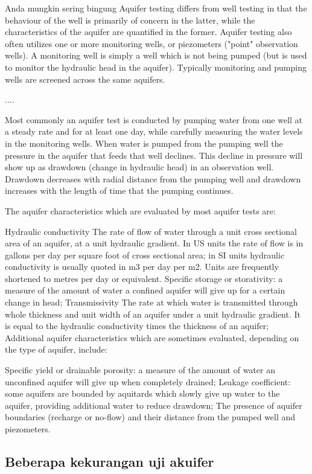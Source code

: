 Anda mungkin sering bingung Aquifer testing differs from well testing in that the behaviour of the well is primarily of concern in the latter, while the characteristics of the aquifer are quantified in the former. Aquifer testing also often utilizes one or more monitoring wells, or piezometers ("point" observation wells). A monitoring well is simply a well which is not being pumped (but is used to monitor the hydraulic head in the aquifer). Typically monitoring and pumping wells are screened across the same aquifers.

....

Most commonly an aquifer test is conducted by pumping water from one well at a steady rate and for at least one day, while carefully measuring the water levels in the monitoring wells. When water is pumped from the pumping well the pressure in the aquifer that feeds that well declines. This decline in pressure will show up as drawdown (change in hydraulic head) in an observation well. Drawdown decreases with radial distance from the pumping well and drawdown increases with the length of time that the pumping continues.

The aquifer characteristics which are evaluated by most aquifer tests are:

Hydraulic conductivity The rate of flow of water through a unit cross sectional area of an aquifer, at a unit hydraulic gradient. In US units the rate of flow is in gallons per day per square foot of cross sectional area; in SI units hydraulic conductivity is usually quoted in m3 per day per m2. Units are frequently shortened to metres per day or equivalent.
Specific storage or storativity: a measure of the amount of water a confined aquifer will give up for a certain change in head;
Transmissivity The rate at which water is transmitted through whole thickness and unit width of an aquifer under a unit hydraulic gradient. It is equal to the hydraulic conductivity times the thickness of an aquifer;
Additional aquifer characteristics which are sometimes evaluated, depending on the type of aquifer, include:

Specific yield or drainable porosity: a measure of the amount of water an unconfined aquifer will give up when completely drained;
Leakage coefficient: some aquifers are bounded by aquitards which slowly give up water to the aquifer, providing additional water to reduce drawdown;
The presence of aquifer boundaries (recharge or no-flow) and their distance from the pumped well and piezometers.

\subsection{Beberapa kekurangan uji akuifer}

